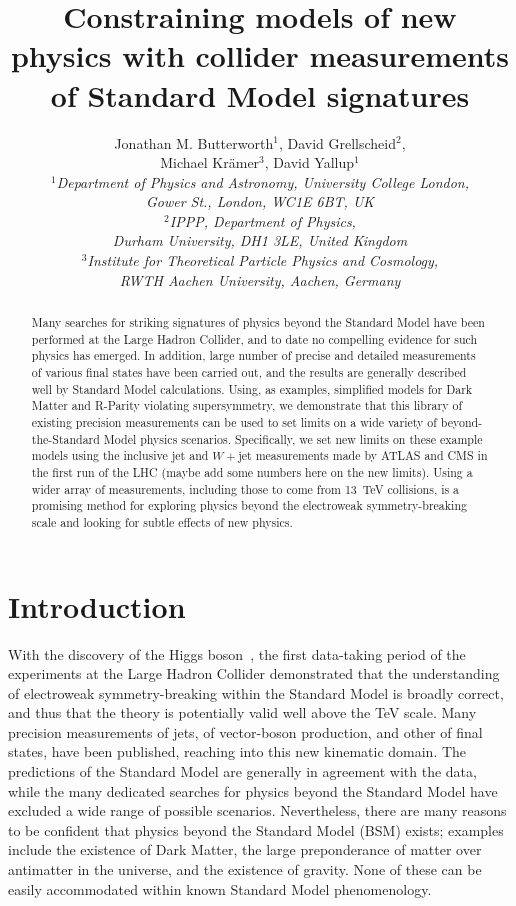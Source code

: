 \documentclass[floatfix]{article}
\title{Constraining models of new physics with collider measurements of Standard Model signatures}
\author{Jonathan M. Butterworth$^1$, David Grellscheid$^2$,\\ Michael Kr\"amer$^3$, David Yallup$^1$\\
\it $^1$Department of Physics and Astronomy, University College London,\\ \it Gower St., London, WC1E 6BT, UK\\
\it $^2$IPPP, Department of Physics,\\\it Durham University, DH1 3LE, United Kingdom\\ \it $^3$Institute for Theoretical Particle Physics and Cosmology, \\ \it RWTH Aachen University, Aachen, Germany}
\begin{document}
\maketitle 

\begin{abstract}
Many searches for striking signatures of physics beyond the Standard Model have been performed at the 
Large Hadron Collider, and to date no compelling evidence for such physics has emerged. 
In addition, large number of precise and detailed
measurements of various final states have been carried out, and the results are generally  
described well by Standard Model calculations.
Using, as examples, simplified models for Dark Matter and R-Parity violating supersymmetry, 
we demonstrate that this library of existing precision measurements can be used to set limits on a wide variety of 
beyond-the-Standard Model physics scenarios. Specifically, we set new limits on these example models using
the inclusive jet and $W+$jet measurements made by ATLAS and CMS in the first run of the LHC 
(maybe add some numbers here on the new limits). Using a wider array
of measurements, including those to come from 13~TeV collisions, is a promising method for exploring 
physics beyond the electroweak symmetry-breaking scale and looking for subtle effects of new physics.
\end{abstract}


\section{Introduction}
\label{sec:intro}

With the discovery of the Higgs boson~\cite{Aad:2012tfa,Chatrchyan:2012ufa}, 
the first data-taking period of the experiments at the 
Large Hadron Collider demonstrated that the understanding of electroweak symmetry-breaking within
the Standard Model is broadly correct, and thus that the theory is potentially valid well above the
TeV scale. Many precision measurements of jets, of vector-boson production, and other of final states, 
have been published, reaching into this new kinematic domain. The predictions of the Standard Model are 
generally in agreement with the data, while the many dedicated searches for physics beyond the Standard Model
have excluded a wide range of possible scenarios. Nevertheless, there are many reasons to be confident that
physics beyond the Standard Model (BSM) exists; examples include the existence of Dark Matter, the large 
preponderance of matter over antimatter in the universe, and the existence of gravity. None of 
these can be easily accommodated within known Standard Model phenomenology. 
\end{document}
